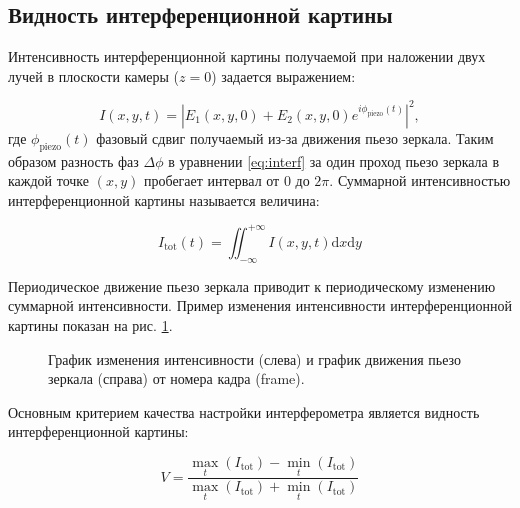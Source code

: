 \subsection{Видность интерференционной картины}\label{sec:ch2/sec1/subsec3}

Интенсивность интерференционной картины получаемой при наложении двух лучей в плоскости камеры ($z=0$) задается выражением:

\begin{equation}
    I(x,y,t)=|E_1(x,y,0)+E_2(x,y,0)e^{i\phi_{\mathrm{piezo}}(t)}|^2,
\label{eq:I_def}
\end{equation}
где $\phi_{\mathrm{piezo}}(t)$ фазовый сдвиг получаемый из-за движения пьезо зеркала. Таким образом разность фаз $\Delta \phi$ в уравнении \eqref{eq:interf} за один проход пьезо зеркала в каждой точке $(x, y)$ пробегает интервал от $0$ до $2\pi$. Суммарной интенсивностью интерференционной картины называется величина: 

\begin{equation}
    I_{\mathrm{tot}}(t) = \iint_{-\infty}^{+\infty} I(x, y, t) {\mathrm{d}}x{\mathrm{d}}y
\end{equation}

Периодическое движение пьезо зеркала приводит к периодическому изменению суммарной интенсивности. Пример изменения интенсивности интерференционной картины показан на рис. \ref{fig:intens_plot}.

\begin{figure}[ht]
\caption{График изменения интенсивности (слева) и график движения пьезо зеркала (справа) от номера кадра (frame).}
\label{fig:intens_plot}
\end{figure}

Основным критерием качества настройки интерферометра является видность интерференционной картины: 

\begin{equation}
    V = \frac{            
        \max_{t}(I_{\mathrm{tot}}) - \min_t(I_{\mathrm{tot}})}
        {\max_{t}(I_{\mathrm{tot}}) + \min_t(I_{\mathrm{tot}})}
    \label{eq:visib}
\end{equation}

